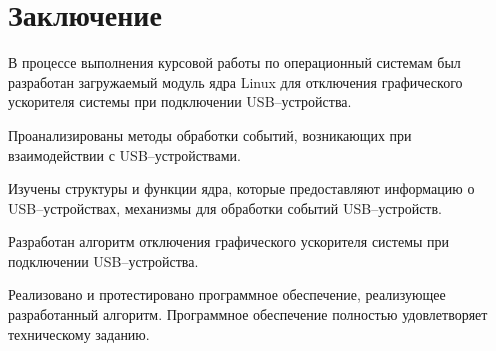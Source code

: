 \chapter*{Заключение}

В процессе выполнения курсовой работы по операционный системам был разработан загружаемый модуль ядра Linux для отключения графического ускорителя системы при подключении USB--устройства.

Проанализированы методы обработки событий, возникающих при взаимодействии с USB--устройствами.

Изучены структуры и функции ядра, которые предоставляют информацию о USB--устройствах, механизмы для обработки событий USB--устройств. 

Разработан алгоритм отключения графического ускорителя системы при подключении USB--устройства.

Реализовано и протестировано программное обеспечение, реализующее разработанный алгоритм. Программное обеспечение полностью удовлетворяет техническому заданию.